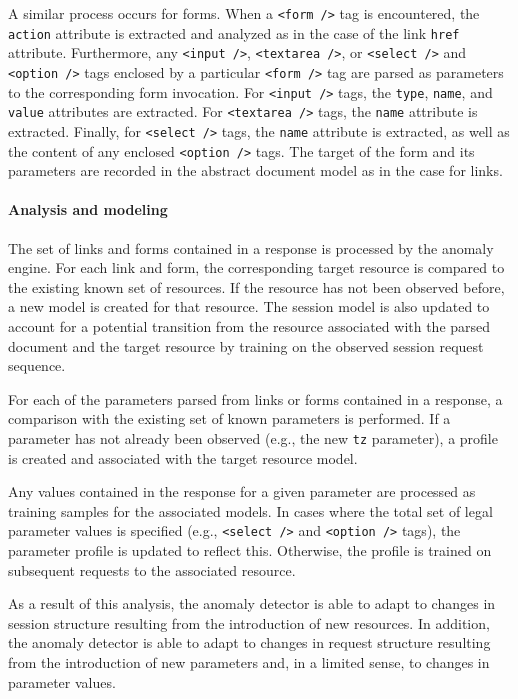 A similar process occurs for forms.  When a \texttt{<form~/>} tag is encountered, the \texttt{action} attribute is extracted and analyzed as in the case of the link \texttt{href} attribute.  Furthermore, any \texttt{<input~/>}, \texttt{<textarea~/>}, or \texttt{<select~/>} and \texttt{<option~/>} tags enclosed by a particular \texttt{<form~/>} tag are parsed as parameters to the corresponding form invocation.  For \texttt{<input~/>} tags, the \texttt{type}, \texttt{name}, and \texttt{value} attributes are extracted. For \texttt{<textarea~/>} tags, the \texttt{name} attribute is extracted.  Finally, for \texttt{<select~/>} tags, the \texttt{name} attribute is extracted, as well as the content of any enclosed \texttt{<option~/>} tags.  The target of the form and its parameters are recorded in the abstract document model as in the case for links.

\paragraph{Analysis and modeling}
\label{web:conceptdrift:design:responses:analysis-modeling}
The set of links and forms contained in a response is processed by the anomaly engine.  For each link and form, the corresponding target resource is compared to the existing known set of resources.  If the resource has not been observed before, a new model is created for that resource.  The session model is also updated to account for a potential transition from the resource associated with the parsed document and the target resource by training on the observed session request sequence.

For each of the parameters parsed from links or forms contained in a response, a comparison with the existing set of known parameters is performed.  If a parameter has not already been observed (e.g., the new \texttt{tz} parameter), a profile is created and associated with the target resource model.

Any values contained in the response for a given parameter are processed as training samples for the associated models.  In cases where the total set of legal parameter values is specified (e.g., \texttt{<select~/>} and \texttt{<option~/>} tags), the parameter profile is updated to reflect this.  Otherwise, the profile is trained on subsequent requests to the associated resource.

As a result of this analysis, the anomaly detector is able to adapt to changes in session structure resulting from the introduction of new resources.  In addition, the anomaly detector is able to adapt to changes in request structure resulting from the introduction of new parameters and, in a limited sense, to changes in parameter values.

